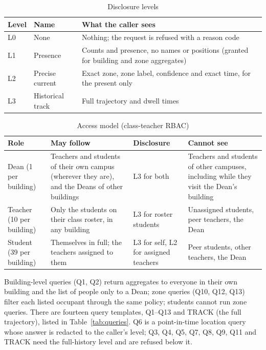 \documentclass[12pt,a4paper,oneside]{report}
\begin{document}
\begin{table}[htbp]
\centering
\caption{Disclosure levels}\label{tab:levels}
{\small\setlength{\tabcolsep}{4pt}\renewcommand{\arraystretch}{1.2}
\begin{tabular}{|p{1.17cm}|p{4.11cm}|p{9.00cm}|}\hline
\textbf{Level} & \textbf{Name} & \textbf{What the caller sees}\\\hline
L0 & None & Nothing; the request is refused with a reason code\\\hline
L1 & Presence & Counts and presence, no names or positions (granted for building and zone aggregates)\\\hline
L2 & Precise current & Exact zone, zone label, confidence and exact time, for the present only\\\hline
L3 & Historical track & Full trajectory and dwell times\\\hline
\end{tabular}}
\end{table}

\begin{table}[htbp]
\centering
\caption{Access model (class-teacher RBAC)}\label{tab:access}
{\small\setlength{\tabcolsep}{4pt}\renewcommand{\arraystretch}{1.2}
\begin{tabular}{|p{2.49cm}|p{5.36cm}|p{2.87cm}|p{3.25cm}|}\hline
\textbf{Role} & \textbf{May follow} & \textbf{Disclosure} & \textbf{Cannot see}\\\hline
Dean (1 per building) & Teachers and students of their own campus (wherever they are), and the Deans of other buildings & L3 for both & Teachers and students of other campuses, including while they visit the Dean's building\\\hline
Teacher (10 per building) & Only the students on their class roster, in any building & L3 for roster students & Unassigned students, peer teachers, the Dean\\\hline
Student (39 per building) & Themselves in full; the teachers assigned to them & L3 for self, L2 for assigned teachers & Peer students, other teachers, the Dean\\\hline
\end{tabular}}
\end{table}

Building-level queries (Q1, Q2) return aggregates to everyone in their own building and the list of people only to a Dean; zone queries (Q10, Q12, Q13) filter each listed occupant through the same policy; students cannot run zone queries. There are fourteen query templates, Q1--Q13 and TRACK (the full trajectory), listed in Table~\ref{tab:queries}. Q6 is a point-in-time location query whose answer is redacted to the caller's level; Q3, Q4, Q5, Q7, Q8, Q9, Q11 and TRACK need the full-history level and are refused below it.
\end{document}
